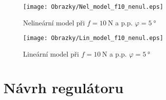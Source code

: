 \documentclass[a4paper, 12pt]{article}
\begin{document}
			\begin{figure}[h]
				\begin{center}
					\texttt{[image: Obrazky/Nel\_model\_f10\_nenul.eps]}
					\label{Nel_model_f10_nenul}
					\caption{Nelineární model při $f=\SI{10}{\newton}$ a p.p. $\varphi = \SI{5}{\degree}$}
				\end{center}
				\begin{center}
					\texttt{[image: Obrazky/Lin\_model\_f10\_nenul.eps]}
					\label{Lin_model_f10_nenul}
					\caption{Lineární model při $f=\SI{10}{\newton}$ a p.p. $\varphi = \SI{5}{\degree}$}
				\end{center}
			\end{figure}
	\clearpage
	\section{Návrh regulátoru}
			
\end{document}
